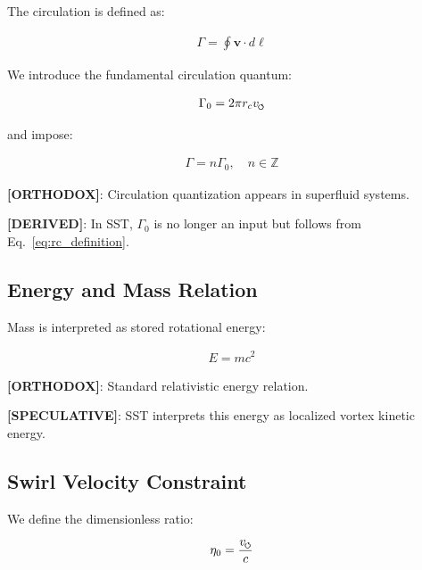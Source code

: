         The circulation is defined as:
        
        \begin{align}
            \Gamma = \oint \mathbf{v} \cdot d\ell
        \end{align}
        
        We introduce the fundamental circulation quantum:
        
        \begin{align}
            \Gamma_0 = 2\pi r_c v_{\swirlarrow}
            \label{eq:gamma0}
        \end{align}
        
        and impose:
        
        \begin{align}
            \Gamma = n \Gamma_0, \quad n \in \mathbb{Z}
        \end{align}
        
        \textbf{[ORTHODOX]}: Circulation quantization appears in superfluid systems.
        
        \textbf{[DERIVED]}: In SST, $\Gamma_0$ is no longer an input but follows from Eq.~\ref{eq:rc_definition}.
    
    \subsection{Energy and Mass Relation}
        
        Mass is interpreted as stored rotational energy:
        
        \begin{align}
            E = m c^2
        \end{align}
        
        \textbf{[ORTHODOX]}: Standard relativistic energy relation.
        
        \textbf{[SPECULATIVE]}: SST interprets this energy as localized vortex kinetic energy.
    
    \subsection{Swirl Velocity Constraint}
        
        We define the dimensionless ratio:
        
        \begin{align}
            \eta_0 = \frac{v_{\swirlarrow}}{c}
        \end{align}
        
